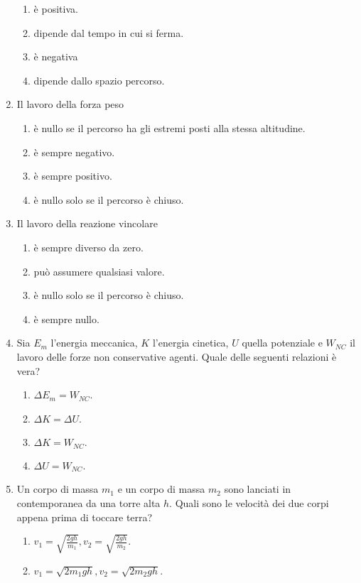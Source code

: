 \documentclass{article}
\begin{document}
\begin{enumerate}
  \begin{enumerate}[label=\Alph*.]
    \item è positiva.
    \item dipende dal tempo in cui si ferma.
    \item è negativa
    \item dipende dallo spazio percorso.
  \end{enumerate}
  \item Il lavoro della forza peso
  \begin{enumerate}[label=\Alph*.]
    \item è nullo se il percorso ha gli estremi posti alla stessa altitudine.
    \item è sempre negativo.
    \item è sempre positivo.
    \item è nullo solo se il percorso è chiuso.
  \end{enumerate}
  \item Il lavoro della reazione vincolare
  \begin{enumerate}[label=\Alph*.]
    \item è sempre diverso da zero.
    \item può assumere qualsiasi valore.
    \item è nullo solo se il percorso è chiuso.
    \item è sempre nullo.
  \end{enumerate}
  \item Sia $E_m$ l'energia meccanica, $K$ l'energia cinetica, $U$ quella potenziale e $W_{NC}$ il lavoro delle forze non conservative agenti. Quale delle seguenti relazioni è vera?
  \begin{enumerate}[label=\Alph*.]
    \item $\Delta E_m=W_{NC}$.
    \item $\Delta K = \Delta U$.
    \item $\Delta K=W_{NC}.$
    \item $\Delta U=W_{NC}$.
  \end{enumerate}
  \item Un corpo di massa $m_1$ e un corpo di massa $m_2$ sono lanciati in contemporanea da una torre alta $h$. Quali sono le velocità dei due corpi appena prima di toccare terra?
  \begin{enumerate}[label=\Alph*.]
    \item $v_1=\sqrt{\frac{2gh}{m_1}}, v_2=\sqrt{\frac{2gh}{m_2}}$.
    \item $v_1=\sqrt{2m_1gh}, v_2=\sqrt{2m_2gh}$.

\end{enumerate}
\end{enumerate}
\end{document}
